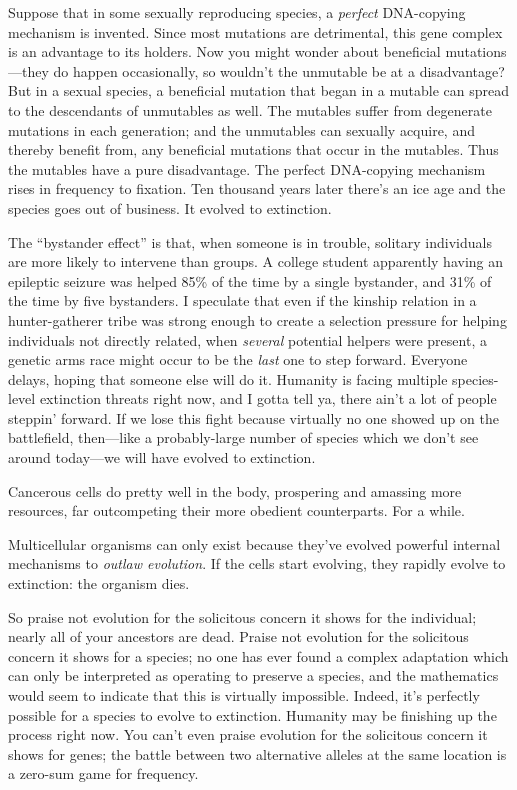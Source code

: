 {{
 Suppose that in some sexually reproducing species, a
\textit{perfect} DNA-copying mechanism is invented. Since most
mutations are detrimental, this gene complex is an advantage to its
holders. Now you might wonder about beneficial mutations---they do
happen occasionally, so wouldn't the unmutable be at a
disadvantage? But in a sexual species, a beneficial mutation that began
in a mutable can spread to the descendants of unmutables as well. The
mutables suffer from degenerate mutations in each generation; and the
unmutables can sexually acquire, and thereby benefit from, any
beneficial mutations that occur in the mutables. Thus the mutables have
a pure disadvantage. The perfect DNA-copying mechanism rises in
frequency to fixation. Ten thousand years later there's
an ice age and the species goes out of business. It evolved to
extinction.}

{
 The ``bystander effect'' is
that, when someone is in trouble, solitary individuals are more likely
to intervene than groups. A college student apparently having an
epileptic seizure was helped 85\% of the time by a single bystander,
and 31\% of the time by five bystanders. I speculate that even if the
kinship relation in a hunter-gatherer tribe was strong enough to create
a selection pressure for helping individuals not directly related, when
\textit{several} potential helpers were present, a genetic arms race
might occur to be the \textit{last} one to step forward. Everyone
delays, hoping that someone else will do it. Humanity is facing
multiple species-level extinction threats right now, and I gotta tell
ya, there ain't a lot of people
steppin' forward. If we lose this fight because
virtually no one showed up on the battlefield, then---like a
probably-large number of species which we don't see
around today---we will have evolved to extinction.}

{
 Cancerous cells do pretty well in the body, prospering and
amassing more resources, far outcompeting their more obedient
counterparts. For a while.}

{
 Multicellular organisms can only exist because
they've evolved powerful internal mechanisms to
\textit{outlaw evolution}. If the cells start evolving, they rapidly
evolve to extinction: the organism dies.}

{
 So praise not evolution for the solicitous concern it shows for
the individual; nearly all of your ancestors are dead. Praise not
evolution for the solicitous concern it shows for a species; no one has
ever found a complex adaptation which can only be interpreted as
operating to preserve a species, and the mathematics would seem to
indicate that this is virtually impossible. Indeed,
it's perfectly possible for a species to evolve to
extinction. Humanity may be finishing up the process right now. You
can't even praise evolution for the solicitous concern
it shows for genes; the battle between two alternative alleles at the
same location is a zero-sum game for frequency.}

}
